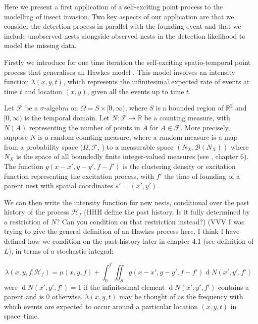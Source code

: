 \documentclass{article}
\renewcommand{\d}[1]{\ensuremath{\operatorname{d}\!{#1}}}
\begin{document}
Here we present a first application of a self-exciting point process to the modelling of insect invasion. Two key aspects of our application are that we consider the detection process in parallel with the founding event and that we include unobserved nests alongside observed nests in the detection likelihood to model the missing data.

Firstly we introduce for one time iteration the self-exciting spatio-temporal point process that generalises an Hawkes model \cite{Hawkes71}. This model involves an intensity function $\lambda(x, y, t)$, which represents the infinitesimal expected rate of events at time $t$ and location $(x, y)$, given all the events up to time $t$.

Let $\mathcal{F}$ be a $\sigma$-algebra on $\Omega = S \times [0, \infty )$, where $S$ is a bounded region of $\mathbb{R}^2$ and $[0, \infty)$ is the temporal domain. Let $N: \mathcal{F} \to \mathbb{R}$ be a counting measure, with $N(A)$ representing the number of points in $A$ for $A \in \mathcal{F}$. More precisely, suppose $N$ is a random counting measure, where a random measure is a map from a probability space $(\Omega, \mathcal{F}$, ) to a measurable space $(N_{X}, \mathcal{B}(N_{X}))$ where $N_{X}$ is the space of all boundedly finite integer-valued measures (see \cite{Daley}, chapter 6). The function $g(x - x', y - y', f - f')$  is the clustering density or excitation function representing the excitation process, with $f'$ the time of founding of a parent nest with spatial coordinates $s' = (x', y')$.

We can then write the intensity function for new nests, conditional over the past history of the process $\mathcal{H}_f$ (HHH define the past history. Is it fully determined by a restriction of $N$? Can you condition on that restriction instead?) {\color{red}(VVV I was trying to give the general definition of an Hawkes process here, I think I have defined how we condition on the past history later in chapter 4.1 (see definition of $L$)}, in terms of a stochastic integral:

\begin{equation}\label{eq:intensity}
    \lambda(x, y, f | \mathcal{H}_f) = \mu(x, y, f) + \int_{0}^{f} \iint_{S} g(x - x', y - y', f - f') \d N(x', y', f')
\end{equation}
were $\d N(x', y', f') = 1$ if the infinitesimal element $\d N(x', y', f')$ contains a parent and is 0 otherwise. $\lambda(x, y, t)$ may be thought of as the frequency with which events are expected to occur around a particular location $(x, y, t)$ in space–time.
\end{document}
